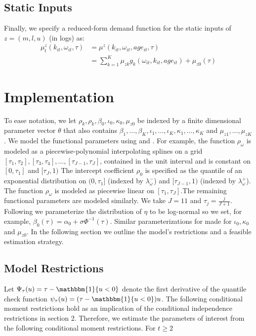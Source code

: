 \documentclass{article}
\begin{document}
\subsection{Static Inputs}
Finally, we specify a reduced-form demand function for the static inputs of $z=(m, l, u)$ (in logs) as:
\begin{equation}\label{staticmodel}
\begin{split}
\mu_{t}^{z}(k_{it}, \omega_{it}, \tau)&=\mu^{z}(k_{it}, \omega_{it}, age_{it}, \tau)\\
&=\sum_{k=1}^{K}\mu_{zk}g_{k}(\omega_{it}, k_{it}, age_{it})+\mu_{z0}(\tau)
\end{split}
\end{equation}

\section{Implementation}
To ease notation, we let $\rho_{k}, \rho_{k}, \beta_{0}, \iota_{0}, \kappa_{0}, \mu_{z0}$ be indexed by a finite dimensional parameter vector $\theta$ that also contains $\beta_{1},\dots,\beta_{K}, \iota_{1},\dots,\iota_{K}, \kappa_{1},\dots, \kappa_{K}$ and $ \mu_{z1},\dots,\mu_{zK}$. We model the functional parameters using \cite{Wei2009} and \cite{Arellano2016}. For example, the function $\rho_{\omega}$ is modeled as a piecewise-polynomial interpolating splines on a grid $[\tau_{1},\tau_{2}], [\tau_{3},\tau_{4}],\dots, [\tau_{J-1},\tau_{J}]$, contained in the unit interval and is constant on $[0, \tau_{1}]$ and $[\tau_{J}, 1)$ The intercept coefficient $\rho_{0}$ is specified as the quantile of an exponential distribution on $(0,\tau_{1}]$ (indexed by $\lambda_{\omega}^{-}$) and $[\tau_{J-1}, 1)$ (indexed by $\lambda_{\omega}^{+}$).\\

The function $\rho_{\omega}$ is modeled as piecewise linear on $[\tau_{1}, \tau_{J}]$.The remaining functional parameters are modeled similarly. We take $J=11$ and $\tau_{j}=\frac{j}{J+1}$. Following \cite{Arellano2017} we parameterize the distribution of $\eta$ to be log-normal so we set, for example, $\beta_{0}(\tau)=\alpha_{0}+\sigma\Phi^{-1}(\tau)$. Similar parameterizations for made for $\iota_{0}, \kappa_{0}$ and $\mu_{z0}$.  In the following section we outline the model's restrictions and a feasible estimation strategy.

\subsection{Model Restrictions}
Let $\Psi_{\tau}(u)=\tau-\mathbbm{1}\{u<0\}$ denote the first derivative of the quantile check function $\psi_{\tau}(u)=(\tau-\mathbbm{1}\{u<0\})u$. The following conditional moment restrictions hold as an implication of the conditional independence restrictions in section 2. Therefore, we estimate the parameters of interest from the following conditional moment restrictions. For $t\geq 2$
\end{document}
